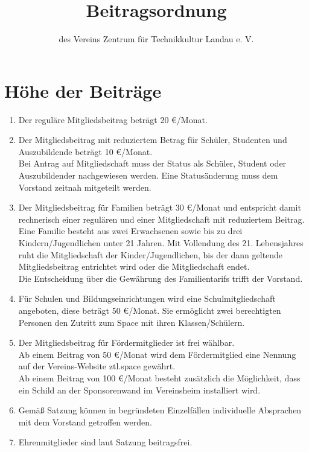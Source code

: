 \documentclass[a4paper, 12pt]{scrartcl}
\begin{document}
\title{Beitragsordnung}
\subtitle{des Vereins Zentrum für Technikkultur Landau e. V.}
\author{}
\date{}

\maketitle

\section{Höhe der Beiträge}\label{beitraege}
\begin{enumerate}
	\item Der reguläre Mitgliedsbeitrag beträgt 20 \euro/Monat.
	\item Der Mitgliedsbeitrag mit reduziertem Betrag für Schüler, Studenten und Auszubildende beträgt 10 \euro/Monat.\\ 
	Bei Antrag auf Mitgliedschaft muss der Status als Schüler, Student oder Auszubildender nachgewiesen werden.
	Eine Statusänderung muss dem Vorstand zeitnah mitgeteilt werden.
	\item \label{beitraege-familienmitgliedschaft} Der Mitgliedsbeitrag für Familien beträgt 30 €/Monat und entspricht damit rechnerisch einer regulären und einer Mitgliedschaft mit reduziertem Beitrag. Eine Familie besteht aus zwei Erwachsenen sowie bis zu drei Kindern/Jugendlichen unter 21 Jahren. Mit Vollendung des 21. Lebensjahres ruht die Mitgliedschaft der Kinder/Jugendlichen, bis der dann geltende Mitgliedsbeitrag entrichtet wird oder die Mitgliedschaft endet.\\
Die Entscheidung über die Gewährung des Familientarifs trifft der Vorstand.
	\item \label{beitraege-schulmitgliedschaft} Für Schulen und Bildungseinrichtungen wird eine Schulmitgliedschaft angeboten, diese beträgt 50 \euro/Monat. Sie ermöglicht zwei berechtigten Personen den Zutritt zum Space mit ihren Klassen/Schülern.
	\item Der Mitgliedsbeitrag für Fördermitglieder ist frei wählbar. \\
	Ab einem Beitrag von 50 \euro/Monat wird dem Fördermitglied eine Nennung auf der Vereins-Website ztl.space gewährt. \\
	Ab einem Beitrag von 100 \euro/Monat besteht zusätzlich die Möglichkeit, dass ein Schild an der Sponsorenwand im Vereinsheim installiert wird.
	\item Gemäß Satzung können in begründeten Einzelfällen individuelle Absprachen mit dem Vorstand getroffen werden. 
	\item Ehrenmitglieder sind laut Satzung beitragsfrei.
\end{enumerate}
\end{document}
